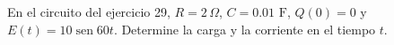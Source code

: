 \item En el circuito del ejercicio 29, $R = 2 \, \Omega$, $C = 0.01 \text{ F}$, $Q(0) = 0$ y $E(t) = 10 \operatorname{sen} 60t$. Determine la carga y la corriente en el tiempo $t$.
